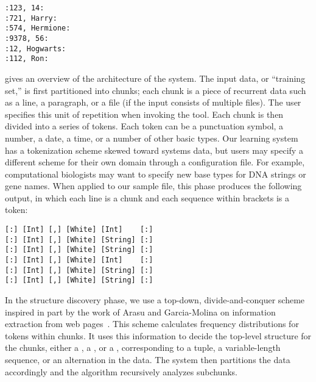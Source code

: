 \documentclass{sig-alt-release2}
\newcommand{\shrink}{\vspace*{-5mm}}
\begin{document}
{\small 
\begin{verbatim}
:123, 14:
:721, Harry:
:574, Hermione:
:9378, 56:
:12, Hogwarts:
:112, Ron:
\end{verbatim}
}

 gives an overview of the architecture of the system.
The input data, or ``training set,'' is first partitioned into chunks;
each chunk is a piece of recurrent data such as a line, 
a paragraph, or a file (if the input consists of multiple files).
The user specifies this unit of repetition when invoking the tool.
Each chunk is then divided into a series of tokens.  Each
token can be a punctuation symbol, a number, a date, a time, or a number of other
basic types.  Our learning system has a tokenization scheme
skewed toward systems data, but users may specify a different scheme 
for their own domain through a configuration file.  For example,
computational biologists may want to specify new base types for DNA strings
or gene names.  When applied to our sample file,
this phase produces the following output, in which each line is a chunk
and each sequence within brackets is a token:

{\small
\begin{verbatim}
[:] [Int] [,] [White] [Int]    [:]
[:] [Int] [,] [White] [String] [:]
[:] [Int] [,] [White] [String] [:]
[:] [Int] [,] [White] [Int]    [:]
[:] [Int] [,] [White] [String] [:]
[:] [Int] [,] [White] [String] [:]
\end{verbatim}
}

\begin {figure*}[tbh]
\begin{center}
\begin{minipage}[t]{0.5\columnwidth}
\end{minipage}
\hfill
\begin{minipage}[t]{0.5\columnwidth}
\end{minipage}
\hfill
\begin{minipage}[t]{0.5\columnwidth}
\end{minipage}
\caption{Histograms calculuated from sample data file (from left to right): 
(a) first iteration, (b) second iteration (context 1) 
and (c) second iteration (context 2)} \label{fig-hist}
\shrink
\end{center}
\end{figure*}

In the structure discovery phase, we use a top-down, divide-and-conquer
scheme inspired in part by the work of Arasu and Garcia-Molina on
information extraction from web pages~\cite{arasu+:sigmod03}. 
This scheme calculates frequency distributions for tokens within
chunks.  It uses this information to
decide the top-level structure for the chunks, either a 
, a , or a , corresponding to a
tuple, a variable-length sequence, or an alternation in the data.
The system then partitions the data accordingly
and the algorithm recursively analyzes subchunks. 
\end{document}
